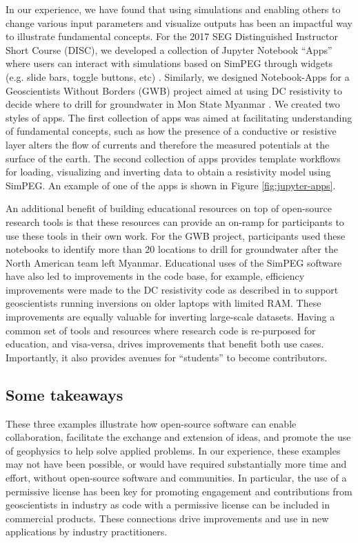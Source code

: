 In our experience, we have found that using simulations and enabling others to change various input parameters and visualize outputs has been an impactful way to illustrate fundamental concepts. For the 2017 SEG Distinguished Instructor Short Course (DISC), we developed a collection of Jupyter Notebook ``Apps'' where users can interact with simulations based on SimPEG through widgets (e.g. slide bars, toggle buttons, etc) \citep{Oldenburg2021}. Similarly, we designed Notebook-Apps for a Geoscientists Without Borders (GWB) project aimed at using DC resistivity to decide where to drill for groundwater in Mon State Myanmar \citep{fan2020improving}. We created two styles of apps. The first collection of apps was aimed at facilitating understanding of fundamental concepts, such as how the presence of a conductive or resistive layer alters the flow of currents and therefore the measured potentials at the surface of the earth. The second collection of apps provides template workflows for loading, visualizing and inverting data to obtain a resistivity model using SimPEG. An example of one of the apps is shown in Figure \ref{fig:jupyter-apps}.





An additional benefit of building educational resources on top of open-source research tools is that these resources can provide an on-ramp for participants to use these tools in their own work. For the GWB project, participants used these notebooks to identify more than 20 locations to drill for groundwater after the North American team left Myanmar. Educational uses of the SimPEG software have also led to improvements in the code base, for example, efficiency improvements were made to the DC resistivity code as described in \cite{Kang2020} to support geoscientists running inversions on older laptops with limited RAM. These improvements are equally valuable for inverting large-scale datasets. Having a common set of tools and resources where research code is re-purposed for education, and visa-versa, drives improvements that benefit both use cases. Importantly, it also provides avenues for ``students'' to become contributors.



\subsection{Some takeaways}

These three examples illustrate how open-source software can enable collaboration, facilitate the exchange and extension of ideas, and promote the use of geophysics to help solve applied problems. In our experience, these examples may not have been possible, or would have required substantially more time and effort, without open-source software and communities. In particular, the use of a permissive license has been key for promoting engagement and contributions from geoscientists in industry as code with a permissive license can be included in commercial products. These connections drive improvements and use in new applications by industry practitioners.

